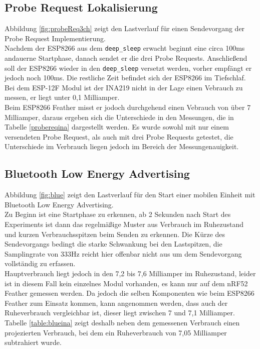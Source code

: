 \subsection{Probe Request Lokalisierung}
Abbildung \ref{fig:probeReq3ch} zeigt den Lastverlauf für einen Sendevorgang der Probe Request Implementierung.\\
Nachdem der ESP8266 aus dem \texttt{deep\_sleep} erwacht beginnt eine circa 100ms andauerne Startphase, danach sendet er die drei Probe Requests.
Anschließend soll der ESP8266 wieder in den \texttt{deep\_sleep} versetzt werden, vorher empfängt er jedoch noch 100ms.
Die restliche Zeit befindet sich der ESP8266 im Tiefschlaf. 
Bei dem ESP-12F Modul ist der INA219 nicht in der Lage einen Vebrauch zu messen, er liegt unter 0,1 Milliamper.\\
Beim ESP8266 Feather misst er jodoch durchgehend einen Vebrauch von über 7 Milliamper, daraus ergeben sich die Unterschiede in den Messungen, die in Tabelle \ref{probereqina} dargestellt werden.
Es wurde sowohl mit nur einem versendeten Probe Request, als auch mit drei Probe Requests getestet, die Unterschiede im Verbrauch liegen jedoch im Bereich der Messungenauigkeit.

\subsection{Bluetooth Low Energy Advertising}
\label{ch:realworld:sec:ble}
Abbildung \ref{fig:blue} zeigt den Lastverlauf für den Start einer mobilen Einheit mit Bluetooth Low Energy Advertising.\\
Zu Beginn ist eine Startphase zu erkennen, ab 2 Sekunden nach Start des Experiments ist dann das regelmäßige Muster aus Verbrauch im Ruhezustand und kurzen Verbrauchsspitzen beim Senden zu erkennen.
Die Kürze des Sendevorgangs bedingt die starke Schwankung bei den Lastspitzen, die Samplingrate von 333Hz reicht hier offenbar nicht aus um dem Sendevorgang vollständig zu erfassen.\\
Hauptverbrauch liegt jedoch in den 7,2 bis 7,6 Milliamper im Ruhezustand, leider ist in diesem Fall kein einzelnes Modul vorhanden, es kann nur auf dem nRF52 Feather gemessen werden.
Da jedoch die selben Komponenten wie beim ESP8266 Feather zum Einsatz kommen, kann angenommen werden, dass auch der Ruheverbrauch vergleichbar ist, dieser liegt zwischen 7 und 7,1 Milliamper.
Tabelle \ref{table:blueina} zeigt deshalb neben dem gemessenen Verbrauch einen projezierten Verbrauch, bei dem ein Ruheverbrauch von 7,05 Milliamper subtrahiert wurde.


